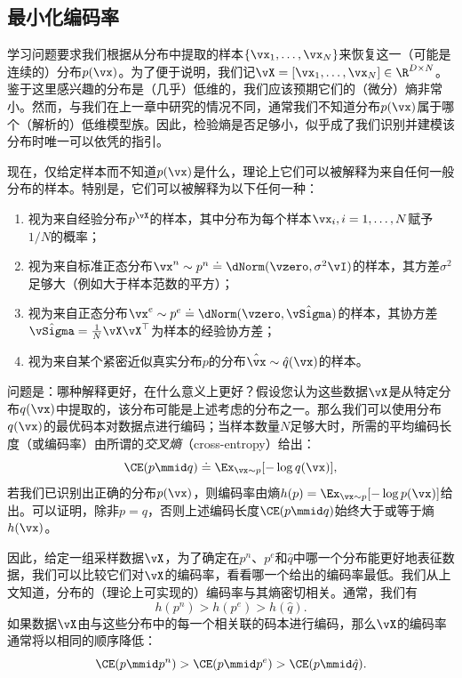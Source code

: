 \documentclass[../../book-main_zh.tex]{subfiles}
\begin{document}
\subsection{最小化编码率}\label{sub:min_entropy}

学习问题要求我们根据从分布中提取的样本\(\{\vx_{1}, \ldots, \vx_{N}\}\)来恢复这一（可能是连续的）分布\(p(\vx)\)。为了便于说明，我们记\(\vX = [\vx_{1}, \ldots, \vx_{N}] \in \R^{D\times N}\)。鉴于这里感兴趣的分布是（几乎）低维的，我们应该预期它们的（微分）熵非常小。然而，与我们在上一章中研究的情况不同，通常我们不知道分布\(p(\vx)\)属于哪个（解析的）低维模型族。因此，检验熵是否足够小，似乎成了我们识别并建模该分布时唯一可以依凭的指引。

现在，仅给定样本而不知道\(p(\vx)\)是什么，理论上它们可以被解释为来自任何一般分布的样本。特别是，它们可以被解释为以下任何一种：
\begin{enumerate}
    \item 视为来自经验分布\(p^{\vX}\)的样本，其中分布为每个样本\(\vx_{i}, i=1, \ldots, N\)赋予\(1/N\)的概率；
    \item 视为来自标准正态分布\(\vx^{n} \sim p^{n} \doteq \dNorm(\vzero, \sigma^{2} \vI)\)的样本，其方差\(\sigma^{2}\)足够大（例如大于样本范数的平方）；
    \item 视为来自正态分布\(\vx^{e} \sim p^{e} \doteq \dNorm(\vzero, \hat{\vSigma})\)的样本，其协方差\(\hat{\vSigma} = \frac{1}{N} \vX \vX^{\top}\)为样本的经验协方差；
    \item 视为来自某个紧密近似真实分布\(p\)的分布\(\hat \vx \sim \hat{q}(\vx)\)的样本。
\end{enumerate}
问题是：哪种解释更好，在什么意义上更好？假设您认为这些数据\(\vX\)是从特定分布\(q(\vx)\)中提取的，该分布可能是上述考虑的分布之一。那么我们可以使用分布\(q(\vx)\)的最优码本对数据点进行编码；当样本数量\(N\)足够大时，所需的平均编码长度（或编码率）由所谓的\textit{交叉熵}（cross-entropy）给出：
\begin{equation}
    \CE(p \mmid q) \doteq \Ex_{\vx \sim p}[-\log q(\vx)],
\end{equation}
若我们已识别出正确的分布\(p(\vx)\)，则编码率由熵\(h(p) = \Ex_{\vx \sim p}[-\log p(\vx)]\)给出。可以证明，除非\(p = q\)，否则上述编码长度\(\CE(p \mmid q)\)始终大于或等于熵\(h(\vx)\)。

因此，给定一组采样数据\(\vX\)，为了确定在\(p^{n}\)、\(p^{e}\)和\(\hat{q}\)中哪一个分布能更好地表征数据，我们可以比较它们对\(\vX\)的编码率，看看哪一个给出的编码率最低。我们从上文知道，分布的（理论上可实现的）编码率与其熵密切相关。通常，我们有
\begin{equation}
    h(p^{n}) > h(p^{e}) > h(\hat{q}).
\end{equation}
如果数据\(\vX\)由与这些分布中的每一个相关联的码本进行编码，那么\(\vX\)的编码率通常将以相同的顺序降低：
\begin{equation}
    \CE(p \mmid p^{n}) > \CE(p \mmid p^{e}) > \CE(p \mmid \hat{q}).
\end{equation}
\end{document}
